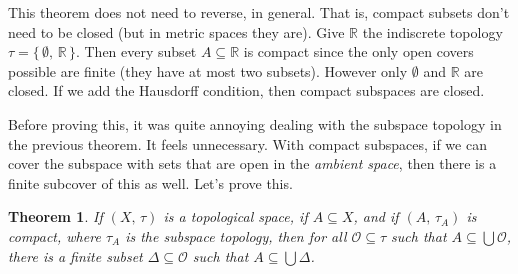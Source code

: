 \documentclass{article}
\theoremstyle{plain}
\newtheorem{theorem}{Theorem}[section]
\theoremstyle{normal}
\begin{document}
        This theorem does not need to reverse, in general. That is, compact
        subsets don't need to be closed (but in metric spaces they are). Give
        $\mathbb{R}$ the indiscrete topology
        $\tau=\{\,\emptyset,\,\mathbb{R}\,\}$. Then every subset
        $A\subseteq\mathbb{R}$ is compact since the only open covers possible
        are finite (they have at most two subsets). However only
        $\emptyset$ and $\mathbb{R}$ are closed. If we add the Hausdorff
        condition, then compact subspaces are closed.
        \par\hfill\par
        Before proving this, it was quite annoying dealing with the subspace
        topology in the previous theorem. It feels unnecessary. With compact
        subspaces, if we can cover the subspace with sets that are open in the
        \textit{ambient space}, then there is a finite subcover of this as
        well. Let's prove this.
        \begin{theorem}
            If $(X,\,\tau)$ is a topological space, if $A\subseteq{X}$, and
            if $(A,\,\tau_{A})$ is compact, where $\tau_{A}$ is the subspace
            topology, then for all $\mathcal{O}\subseteq\tau$ such that
            $A\subseteq\bigcup\mathcal{O}$, there is a finite subset
            $\Delta\subseteq\mathcal{O}$ such that $A\subseteq\bigcup\Delta$.
        \end{theorem}
\end{document}
